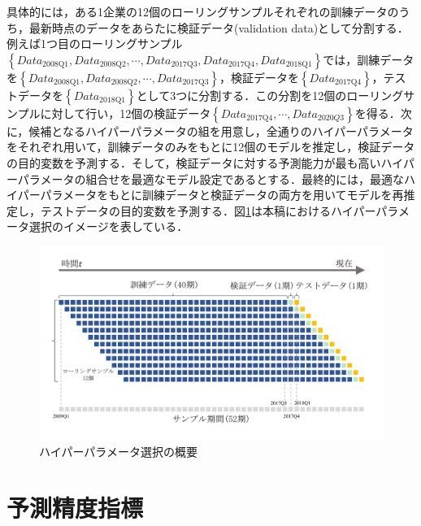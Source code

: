 \documentclass[a4paper，12pt]{jsarticle}
\begin{document}
具体的には，ある1企業の12個のローリングサンプルそれぞれの訓練データのうち，最新時点のデータをあらたに検証データ(validation data)として分割する．例えば1つ目のローリングサンプル$\left\{Data_{\text{2008Q1}}, Data_{\text{2008Q2}}, \cdots, Data_{\text{2017Q3}}, Data_{\text{2017Q4}}, Data_{\text{2018Q1}}\right\}$では，訓練データを$\left\{Data_{\text{2008Q1}}, Data_{\text{2008Q2}}, \cdots, Data_{\text{2017Q3}}\right\}$，検証データを$\left\{Data_{\text{2017Q4}}\right\}$，テストデータを$\left\{Data_{\text{2018Q1}}\right\}$として3つに分割する．この分割を12個のローリングサンプルに対して行い，12個の検証データ$\left\{Data_{\text{2017Q4}}, \cdots , Data_{2020Q3}\right\}$を得る．次に，候補となるハイパーパラメータの組を用意し，全通りのハイパーパラメータをそれぞれ用いて，訓練データのみをもとに12個のモデルを推定し，検証データの目的変数を予測する．そして，検証データに対する予測能力が最も高いハイパーパラメータの組合せを最適なモデル設定であるとする．最終的には，最適なハイパーパラメータをもとに訓練データと検証データの両方を用いてモデルを再推定し，テストデータの目的変数を予測する．図\ref{fig:hyparam_selection}は本稿におけるハイパーパラメータ選択のイメージを表している．


\begin{figure}[htbp]
  \centering
  \includegraphics[width=15cm]{./img/_rolling_sample_val.pdf}
  \caption{ハイパーパラメータ選択の概要}
  \label{fig:hyparam_selection}
\end{figure}


\section{予測精度指標}
\end{document}
